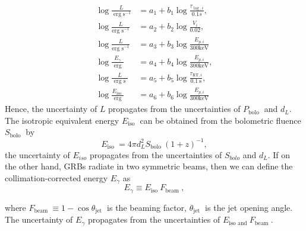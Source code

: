 \begin{align}
\log \frac{L}{\operatorname{erg} \mathrm{s}^{-1}} &= a_{1}+b_{1} \log \frac{\tau_{\operatorname{lag}, i}}{0.1 s}, \\
\log \frac{L}{\operatorname{erg~s}^{-1}} &= a_{2}+b_{2} \log \frac{V_{i}}{0.02}, \\
 \log \frac{L}{\operatorname{erg~s}^{-1}} &= a_{3}+b_{3} \log \frac{E_{p, i}}{300 \mathrm{keV}}\\
\log \frac{E_{\gamma}}{\text { erg }} &= a_{4}+b_{4} \log \frac{E_{p, i}}{300 \mathrm{keV}}, \\
\log \frac{L}{\text { erg s }} &= a_{5}+b_{5} \log \frac{\tau_{\mathrm{RT}, i}}{0.1 \mathrm{~s}}, \\
\log \frac{E_{\text {iso }}}{\text { erg }} &= a_{6}+b_{6} \log \frac{E_{p, i}}{300 \mathrm{keV}}
\end{align}
Hence, the uncertainty of $L$ propagates from the uncertainties of $P_{\text {bolo }}$ and $d_{L}$. The isotropic equivalent energy $E_{\text {iso }}$ can be obtained from the bolometric fluence $S_{\text {bolo }}$ by
$$
E_{\text {iso }}=4 \pi d_{L}^{2} S_{\text {bolo }}(1+z)^{-1},
$$
the uncertainty of $E_{iso}$ propagates from the uncertainties of $S_{bolo}$ and $d_L$. If on the other hand, GRBs radiate in two symmetric beams, then we can define the collimation-corrected energy $E_{\gamma}$ as
$$
E_{\gamma} \equiv E_{\text {iso }} F_{\text {beam }},
$$

where $F_{\text {beam }} \equiv 1-\cos \theta_{\text {jet }}$ is the beaming factor, $\theta_{\text {jet }}$ is the jet opening angle. The uncertainty of $E_{\gamma}$ propagates from the uncertainties of $E_{\text {iso and }} F_{\text {beam }}$.

